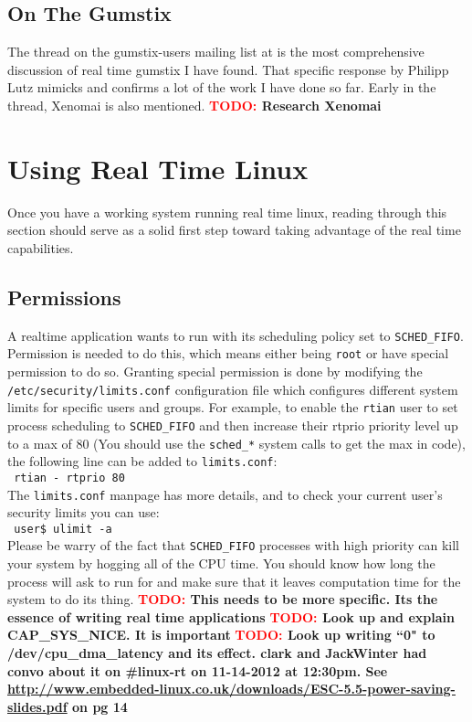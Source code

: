 \documentclass{article}
\newcommand{\TODO}[1]{ {\bf \textcolor{red}{TODO:} #1 }}
\newcommand{\userCom}[1]{\\\indent\indent\texttt{ \small user\$ #1}\\}
\newcommand{\bashCode}[1]{\\\indent\indent\texttt{ \small #1} \\}
\newcommand{\lineCode}[1]{\bashCode{#1}}
\begin{document}
\subsection{On The Gumstix}
The thread on the gumstix-users mailing list at \cite{gumstixRtThread} is the most comprehensive discussion of real time gumstix I have found.  That specific response by Philipp Lutz mimicks and confirms a lot of the work I have done so far. Early in the thread, Xenomai \cite{xenomai} is also mentioned.  \TODO{Research Xenomai}



\section{Using Real Time Linux}
Once you have a working system running real time linux, reading through this section should serve as a solid first step toward taking advantage of the real time capabilities. 

\subsection{Permissions}
A realtime application wants to run with its scheduling policy set to \texttt{SCHED\_FIFO}.  Permission is needed to do this, which means either being \texttt{root} or have special permission to do so.  Granting special permission is done by modifying the \texttt{/etc/security/limits.conf} configuration file which configures different system limits for specific users and groups.  For example, to enable the \texttt{rtian} user to set process scheduling to \texttt{SCHED\_FIFO} and then increase their rtprio priority level up to a max of 80 (You should use the \texttt{sched\_*} system calls to get the max in code), the following line can be added to \texttt{limits.conf}:\lineCode{rtian    -     rtprio    80}The \texttt{limits.conf} manpage has more details, and to check your current user's security limits you can use: \userCom{ulimit -a}

Please be warry of the fact that \texttt{SCHED\_FIFO} processes with high priority can kill your system by hogging all of the CPU time.  You should know how long the process will ask to run for and make sure that it leaves computation time for the system to do its thing.  
\TODO{This needs to be more specific.  Its the essence of writing real time applications}
\TODO{Look up and explain CAP\_SYS\_NICE.  It is important}
\TODO{Look up writing ``0" to /dev/cpu\_dma\_latency and its effect. clark and JackWinter had convo about it on \#linux-rt on 11-14-2012 at 12:30pm.  See \url{http://www.embedded-linux.co.uk/downloads/ESC-5.5-power-saving-slides.pdf} on pg 14}
\end{document}
